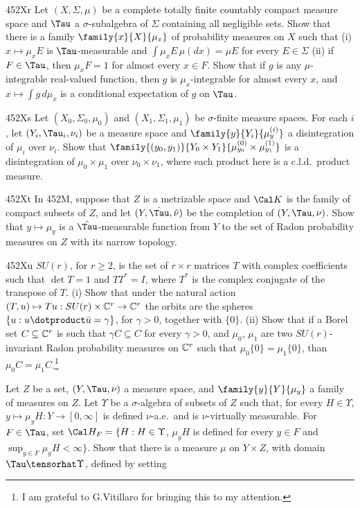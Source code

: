 {\sqheader 452Xr Let $(X,\Sigma,\mu)$ be a complete totally finite
countably compact measure space and $\Tau$ a
$\sigma$-subalgebra of $\Sigma$ containing all negligible sets.   Show
that there is a
family $\family{x}{X}{\mu_x}$ of probability measures on $X$ such that
(i) $x\mapsto\mu_xE$ is $\Tau$-measurable and
$\int\mu_xE\,\mu(dx)=\mu E$ for every $E\in\Sigma$ (ii) if $F\in\Tau$,
then $\mu_xF=1$ for almost
every $x\in F$.   Show that if $g$ is any $\mu$-integrable real-valued
function, then $g$ is $\mu_x$-integrable for almost every $x$, and
$x\mapsto\int g\,d\mu_x$ is a conditional expectation of $g$ on $\Tau$.

\spheader 452Xs
Let $(X_0,\Sigma_0,\mu_0)$ and $(X_1,\Sigma_1,\mu_1)$ be
$\sigma$-finite measure spaces.
For each $i$, let $(Y_i,\Tau_i,\nu_i)$ be a measure space and
$\family{y}{Y_i}{\mu^{(i)}_{y}}$ a disintegration of $\mu_i$ over $\nu_i$.
Show that
$\family{(y_0,y_1)}{Y_0\times Y_1}{\mu^{(0)}_{y_0}\times\mu^{(1)}_{y_1}}$
is a disintegration of $\mu_0\times\mu_1$ over $\nu_0\times\nu_1$, where
each product here is a c.l.d.\ product measure.

\spheader 452Xt
In 452M, suppose that $Z$ is a metrizable space and $\Cal K$ is the family
of compact subsets of $Z$, and let $(Y,\hat\Tau,\hat\nu)$ be the completion
of $(Y,\Tau,\nu)$.   Show that $y\mapsto\mu_y$ is a $\hat\Tau$-measurable
function from $Y$ to the set of Radon probability measures on $Z$ with
its narrow topology.   

\spheader 452Xu $SU(r)$, for $r\ge 2$,
is the set of $r\times r$ matrices $T$ with complex coefficients such that
$\det T=1$ and $TT^*=I$, where $T^*$ is the complex conjugate of the
transpose of $T$.   (i) Show that under the natural action
$(T,u)\mapsto Tu:SU(r)\times\Bbb C^r\to\Bbb C^r$ the orbits are the
spheres $\{u:u\dotproduct\bar u=\gamma\}$, for $\gamma>0$, together with
$\{0\}$.   (ii) Show that if a Borel set $C\subseteq\Bbb C^r$ is such that
$\gamma C\subseteq C$ for every $\gamma>0$, and $\mu_0$, $\mu_1$ are two
$SU(r)$-invariant Radon probability measures on $\Bbb C^r$ such that
$\mu_0\{0\}=\mu_1\{0\}$, than $\mu_0C=\mu_1C$.\footnote{I am grateful to
G.Vitillaro for bringing this to my attention.}

Let $Z$ be a set, $(Y,\Tau,\nu)$ a measure space, and
$\family{y}{Y}{\mu_y}$ a family of measures on $Z$.   Let $\Upsilon$
be a $\sigma$-algebra of subsets of $Z$ such that, for every
$H\in\Upsilon$, $y\mapsto\mu_yH:Y\to[0,\infty]$ is defined $\nu$-a.e.\
and is $\nu$-virtually measurable.
For $F\in\Tau$, set $\Cal H_F=\{H:H\in\Upsilon$, $\mu_yH$ is defined for
every $y\in F$ and $\sup_{y\in F}\mu_yH<\infty\}$.   Show that there is
a measure $\mu$
on $Y\times Z$, with domain $\Tau\tensorhat\Upsilon$, defined by setting

}
